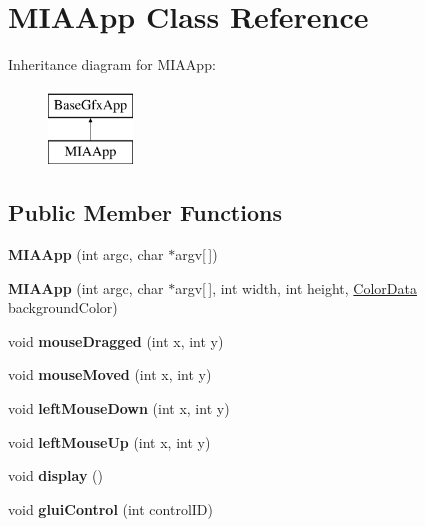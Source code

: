 \hypertarget{classMIAApp}{\section{M\-I\-A\-App Class Reference}
\label{classMIAApp}
}
Inheritance diagram for M\-I\-A\-App\-:\begin{figure}[H]
\begin{center}
\leavevmode
\includegraphics[height=2.000000cm]{classMIAApp}
\end{center}
\end{figure}
\subsection*{Public Member Functions}
\begin{DoxyCompactItemize}
\item 
\hypertarget{classMIAApp_a99c82819221bee486f5eb1628df3dc58}{{\bfseries M\-I\-A\-App} (int argc, char $\ast$argv\mbox{[}$\,$\mbox{]})}\label{classMIAApp_a99c82819221bee486f5eb1628df3dc58}

\item 
\hypertarget{classMIAApp_a0dbcbcd31a2ba7fd55988354e9cc0d93}{{\bfseries M\-I\-A\-App} (int argc, char $\ast$argv\mbox{[}$\,$\mbox{]}, int width, int height, \hyperlink{classColorData}{Color\-Data} background\-Color)}\label{classMIAApp_a0dbcbcd31a2ba7fd55988354e9cc0d93}

\item 
\hypertarget{classMIAApp_a92f074cdaf7660abf7da902ad78f7ceb}{void {\bfseries mouse\-Dragged} (int x, int y)}\label{classMIAApp_a92f074cdaf7660abf7da902ad78f7ceb}

\item 
\hypertarget{classMIAApp_a89342bccfdad6cd476677f19edf7c9bd}{void {\bfseries mouse\-Moved} (int x, int y)}\label{classMIAApp_a89342bccfdad6cd476677f19edf7c9bd}

\item 
\hypertarget{classMIAApp_a8174b71f6537aea41c1cda099e47a0d0}{void {\bfseries left\-Mouse\-Down} (int x, int y)}\label{classMIAApp_a8174b71f6537aea41c1cda099e47a0d0}

\item 
\hypertarget{classMIAApp_a804a0a6a7e3f165adea88bb416232803}{void {\bfseries left\-Mouse\-Up} (int x, int y)}\label{classMIAApp_a804a0a6a7e3f165adea88bb416232803}

\item 
\hypertarget{classMIAApp_a5b88636a4d17872ab922a4b088696608}{void {\bfseries display} ()}\label{classMIAApp_a5b88636a4d17872ab922a4b088696608}

\item 
\hypertarget{classMIAApp_affee3adfef9a7491607d93554a2bb9c0}{void {\bfseries glui\-Control} (int control\-I\-D)}\label{classMIAApp_affee3adfef9a7491607d93554a2bb9c0}

\end{DoxyCompactItemize}
